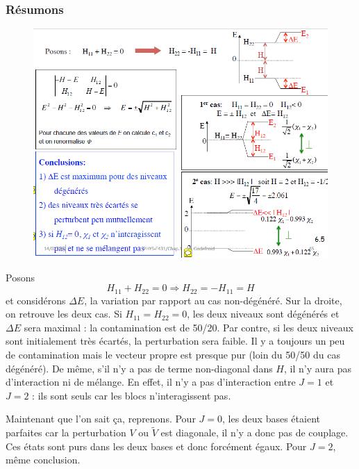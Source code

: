 \subsubsection{Résumons}
	\begin{figure}
	\vspace{-5mm}
	\includegraphics[scale=0.4]{ch1/image8}
	\end{figure}
Posons
\begin{equation}
H_{11}+H_{22}=0\Rightarrow H_{22}=-H_{11}=H
\end{equation}
et considérons $\Delta E$, la variation par rapport au cas non-dégénéré.
Sur la droite, on retrouve les deux cas. Si $H_{11}=H_{22}=0$, les deux niveaux sont
dégénérés et $\Delta E$ sera maximal : la contamination est de 50/20. Par contre, si les
deux niveaux sont initialement très écartés, la perturbation sera faible. Il y a toujours
un peu de contamination mais le vecteur propre est presque pur (loin du 50/50 du cas dégénéré).
De même, s'il n'y a pas de terme non-diagonal dans $H$, il n'y aura pas d'interaction ni de 
mélange. En effet, il n'y a pas d'interaction entre $J=1$ et $J=2$ : ils sont seuls car les
blocs n'interagissent pas.

\newpage
Maintenant que l'on sait ça, reprenons. Pour $J=0$, les deux bases étaient parfaites car la
perturbation $V$ ou $\tilde{V}$ est diagonale, il n'y a donc pas de couplage. Ces états sont
purs dans les deux bases et donc forcément égaux. Pour $J=2$, même conclusion.\\

